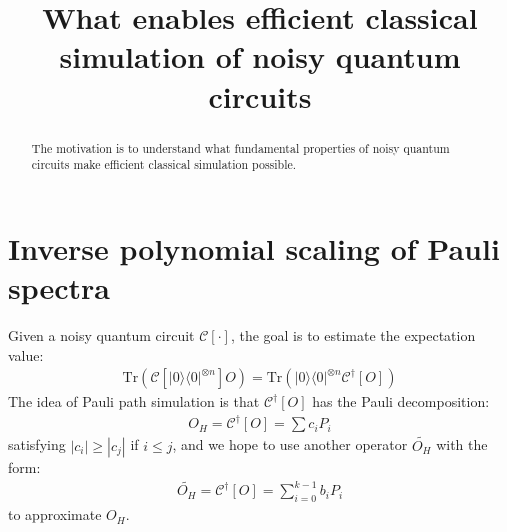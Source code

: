 \documentclass[showpacs,amsmath,amssymb,twocolumn,superscriptaddress,notitlepage,preprintnumbers,aps,pra,10pt,floatfix]{revtex4-2}
\begin{document}
\let\oldacl\addcontentsline
\renewcommand{\addcontentsline}[3]{}
\newcommand{\Tr}{\mathrm{Tr}}
\newcommand{\szx}[1]{\textcolor{red}{(SZX: #1)}}
\title{What enables efficient classical simulation of noisy quantum circuits}

\begin{abstract}
The motivation is to understand what fundamental properties of noisy quantum circuits make efficient classical simulation possible.
\end{abstract}
\maketitle

\section{Inverse polynomial scaling of Pauli spectra}

Given a noisy quantum circuit $\mathcal{C}[\cdot]$, the goal is to estimate the expectation value:
\begin{eqnarray}
\Tr(\mathcal{C}[|0\rangle\langle 0|^{\otimes n}]O)=\Tr(|0\rangle\langle 0|^{\otimes n}\mathcal{C}^\dag[O])
\end{eqnarray}
The idea of Pauli path simulation is that $\mathcal{C}^\dag[O]$ has the Pauli decomposition:
\begin{eqnarray}
O_H=\mathcal{C}^\dag[O]=\sum c_i P_i
\end{eqnarray}
satisfying $|c_i|\geq |c_j|$ if $i\leq j$, and we hope to use another operator $\widetilde{O_H}$ with the form:
\begin{eqnarray}
\widetilde{O_H}=\mathcal{C}^\dag[O]=\sum_{i=0}^{k-1} b_i P_i
\end{eqnarray}
to approximate $O_H$.
\end{document}

